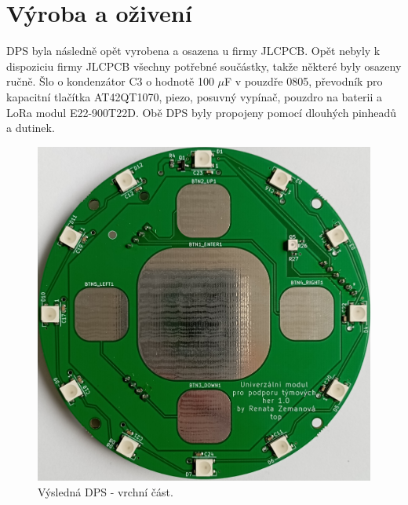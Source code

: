 \newpage
\section{Výroba a oživení}

DPS byla následně opět vyrobena a osazena u firmy JLCPCB. Opět nebyly k dispoziciu firmy JLCPCB všechny potřebné součástky, takže některé byly osazeny ručně. Šlo o kondenzátor C3 o hodnotě 100 $\mu$F v pouzdře 
0805, převodník pro kapacitní tlačítka AT42QT1070, piezo, posuvný vypínač, pouzdro na baterii a LoRa modul E22-900T22D. Obě DPS byly propojeny pomocí dlouhých pinheadů a dutinek. 

\begin{figure}[!h]
  \begin{center}
    \includegraphics[scale=0.15]{obrazky/DPS_final_vrchni.jpg}
  \end{center}
  \caption[Výsledná DPS - vrchní část]{Výsledná DPS - vrchní část.}
\end{figure}

